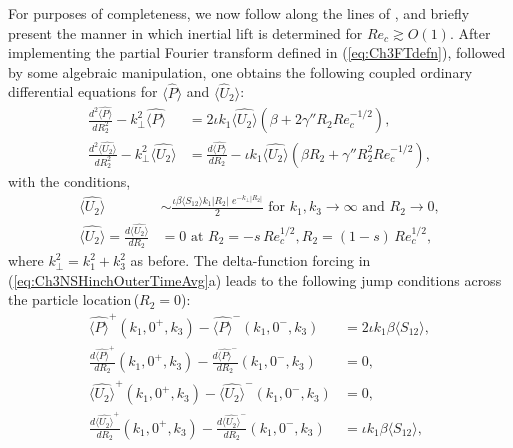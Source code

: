 \documentclass{jfm}
\begin{document}
For purposes of completeness, we now follow along the lines of \cite{schonberghinch1989}, and briefly present the manner in which inertial lift is determined for $Re_c \gtrsim O(1)$. After implementing the partial Fourier transform defined in (\ref{eq:Ch3FTdefn}), followed by some algebraic manipulation, one obtains the following coupled ordinary differential equations for $\langle \hat{P} \rangle$ and $\langle \hat{U}_2 \rangle$:
\begin{subequations}
	\begin{align}
	\frac{d^2 \hat{\langle P\rangle}}{dR_2^2}-k_\perp^2\hat{\langle P\rangle}&=2\iota k_1 \hat{\langle U_2\rangle}(\beta+2\gamma''R_2 Re_c^{-1/2}),\\
	\frac{d^2\hat{\langle U_2\rangle}}{dR_2^2}-k_\perp^2\hat{\langle U_2\rangle}&=\frac{d\hat{\langle P\rangle}}{dR_2}-\iota k_1\hat{\langle U_2\rangle}(\beta R_2+\gamma''R_2^2 Re_c^{-1/2}),
	\end{align} \label{eq:Ch3HinchODEs}
\end{subequations}
with the conditions, 
\begin{subequations}
	\begin{align} 
	\hat{\langle U_2\rangle} &\sim\frac{\iota \beta\langle S_{12}\rangle k_1 |R_2|\,\,e^{-k_\perp |R_2|}}{2}  \text{ for } k_1,k_3\to\infty \text{ and } R_2\rightarrow 0,\\
	\hat{\langle U_2\rangle}=\frac{d\hat{\langle U_2\rangle}}{dR_2}&=0 \text{ at } R_2=-s\,Re_c^{1/2},R_2=(1-s)\,Re_c^{1/2},
	\end{align} \label{eq:Ch3HinchBC}
\end{subequations}
where $k_\perp^2=k_1^2+k_3^2$ as before. The delta-function forcing in (\ref{eq:Ch3NSHinchOuterTimeAvg}a) leads to the following jump conditions across the particle location\,($R_2=0$):
\begin{subequations}
	\begin{align}
	\hat{\langle P\rangle}^+(k_1,0^+,k_3)-\hat{\langle P\rangle}^-(k_1,0^-,k_3) &=2\iota k_1 \beta\langle S_{12}\rangle,\\
	\frac{d\hat{\langle P\rangle}^+}{dR_2}(k_1,0^+,k_3)-\frac{d\hat{\langle P\rangle}^-}{dR_2}(k_1,0^-,k_3) &=0,\\
	\hat{\langle U_2\rangle}^+(k_1,0^+,k_3)-\hat{\langle U_2\rangle}^-(k_1,0^-,k_3) &=0,\\
	\frac{d\hat{\langle U_2\rangle}^+}{dR_2}(k_1,0^+,k_3)-\frac{d\hat{\langle U_2\rangle}^-}{dR_2}(k_1,0^-,k_3) &=\iota k_1 \beta \langle S_{12}\rangle,
	\end{align} \label{eq:Ch3JumpCondns}
\end{subequations}
\end{document}
